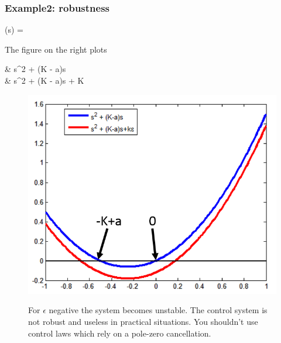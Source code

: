 \begin{frame}
	\frametitle{Example2: robustness}
	\begin{flalign*}
		(s) = 
	\end{flalign*}
	The figure on the right plots
	\begin{flalign*}
	&{\color{blue} s^2 + (K - a)s} \\
	&{\color{red} s^2 + (K - a)s + \epsilon K}
	\end{flalign*}
	\begin{figure}
\center
\includegraphics[width=0.7\linewidth]{robustness-example}
\caption{}
\label{fig:robustness-example}
For $\epsilon$ negative the system becomes unstable. The control system is not robust and useless in practical situations. You shouldn’t use control laws which rely on a pole-zero cancellation. 
\end{figure}
	
\end{frame}



